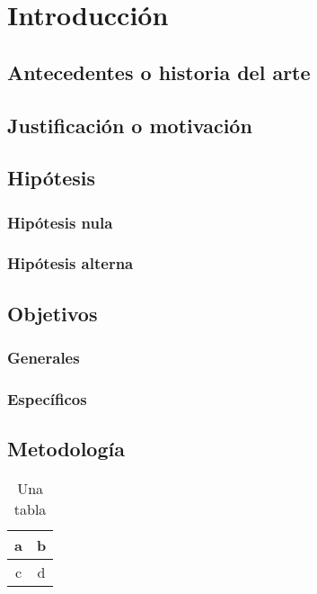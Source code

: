 \chapter{Introducción}

\section{Antecedentes o historia del arte}

\section{Justificación o motivación}

\section{Hipótesis}
\subsection{Hipótesis nula}
\subsection{Hipótesis alterna}

\section{Objetivos}

\subsection{Generales}

\subsection{Específicos}

\section{Metodología}




\begin{table}[ht]
	\centering
	\caption{Una tabla}
	\label{tab:una-tablita}
		\begin{tabular}{|c|c|}
			\hline
			a & b \\
			\hline
			c & d \\
			\hline
		\end{tabular}
\end{table}




